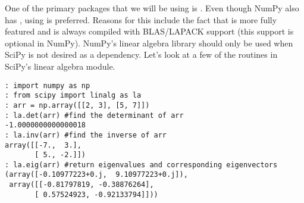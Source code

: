 One of the primary packages that we will be using is .
Even though NumPy also has , using  is preferred.  
Reasons for this include the fact that  is more fully featured and is always compiled with BLAS/LAPACK support (this support is optional in NumPy).  
NumPy's linear algebra library should only be used when SciPy is not desired as a dependency.
Let's look at a few of the routines in SciPy's linear algebra module.
\begin{lstlisting}
: import numpy as np
: from scipy import linalg as la
: arr = np.array([[2, 3], [5, 7]])
: la.det(arr) #find the determinant of arr
-1.0000000000000018
: la.inv(arr) #find the inverse of arr
array([[-7.,  3.],
       [ 5., -2.]])
: la.eig(arr) #return eigenvalues and corresponding eigenvectors
(array([-0.10977223+0.j,  9.10977223+0.j]),
 array([[-0.81797819, -0.38876264],
       [ 0.57524923, -0.92133794]]))
\end{lstlisting}

